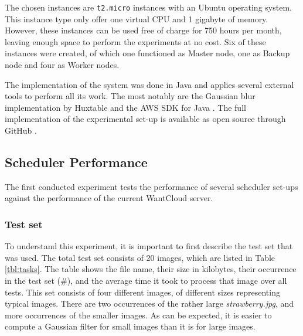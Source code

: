 \documentclass{acm_proc_article-sp}
\begin{document}
The chosen instances are \texttt{t2.micro} instances with an Ubuntu operating system.
This instance type only offer one virtual CPU and 1 gigabyte of memory.
However, these instances can be used free of charge for 750 hours per month, leaving enough space to perform the experiments at no cost.
Six of these instances were created, of which one functioned as Master node, one as Backup node and four as Worker nodes.

The implementation of the system was done in Java and applies several external tools to perform all its work.
The most notably are the Gaussian blur implementation by Huxtable \cite{web:huxtable} and the AWS SDK for Java \cite{web:sdk}.
The full implementation of the experimental set-up is available as open source through GitHub \cite{web:git}.

\subsection{Scheduler Performance}
The first conducted experiment tests the performance of several scheduler set-ups against the performance of the current WantCloud server.

\subsubsection{Test set}
To understand this experiment, it is important to first describe the test set that was used.
The total test set consists of 20 images, which are listed in Table \ref{tbl:tasks}.
The table shows the file name, their size in kilobytes, their occurrence in the test set (\#), and the average time it took to process that image over all tests.
This set consists of four different images, of different sizes representing typical images.
There are two occurrences of the rather large \emph{strawberry.jpg}, and more occurrences of the smaller images.
As can be expected, it is easier to compute a Gaussian filter for small images than it is for large images.
\end{document}
